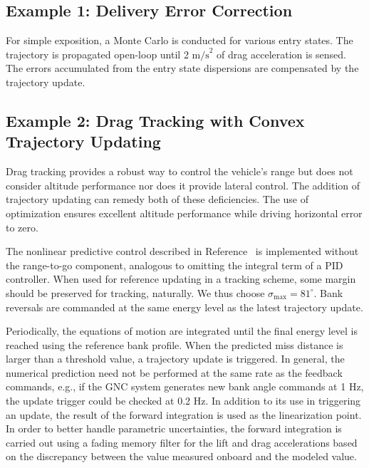 \documentclass[letterpaper, preprint, paper,11pt]{AAS}	%
\begin{document}
	\subsection{Example 1: Delivery Error Correction}

	For simple exposition, a Monte Carlo is conducted for various entry states. The trajectory is propagated open-loop until 2 $ \mathrm{m/s}^2 $ of drag acceleration is sensed. The errors accumulated from the entry state dispersions are compensated by the trajectory update. 

	
	\subsection{Example 2: Drag Tracking with Convex Trajectory Updating}
	Drag tracking provides a robust way to control the vehicle's range but does not consider altitude performance nor does it provide lateral control. The addition of trajectory updating can remedy both of these deficiencies. The use of optimization ensures excellent altitude performance while driving horizontal error to zero. 
	
	The nonlinear predictive control described in Reference~ is implemented without the range-to-go component, analogous to omitting the integral term of a PID controller. When used for reference updating in a tracking scheme, some margin should be preserved for tracking, naturally. We thus choose $\sigma_{\max}=81^{\circ}$. Bank reversals are commanded at the same energy level as the latest trajectory update. 
	
	Periodically, the equations of motion are integrated until the final energy level is reached using the reference bank profile. When the predicted miss distance is larger than a threshold value, a trajectory update is triggered. In general, the numerical prediction need not be performed at the same rate as the feedback commands, e.g., if the GNC system generates new bank angle commands at 1 Hz, the update trigger could be checked at 0.2 Hz. In addition to its use in triggering an update, the result of the forward integration is used as the linearization point. In order to better handle parametric uncertainties, the forward integration is carried out using a fading memory filter for the lift and drag accelerations based on the discrepancy between the value measured onboard and the modeled value.\cite{lu2014entry}
	
\end{document}
